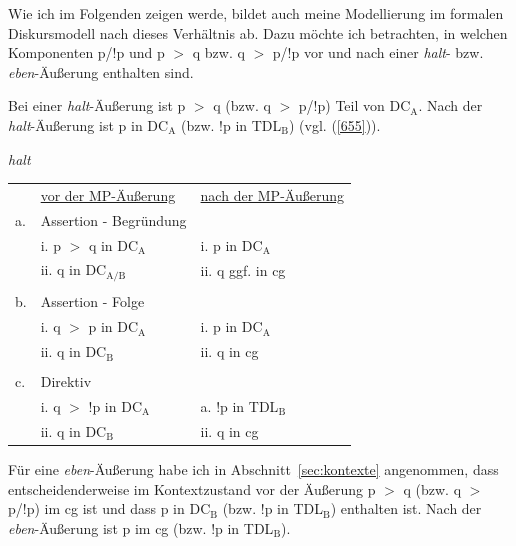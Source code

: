 Wie ich im Folgenden zeigen werde, bildet auch meine Modellierung im formalen Diskursmodell nach \citet{Farkas2010} dieses Verhältnis ab. Dazu möchte ich betrachten, in welchen Komponenten p/!p und p $>$ q bzw. q $>$ p/!p vor und nach einer \textit{halt}- bzw. \textit{eben}-Äußerung enthalten sind.  

Bei einer \textit{halt}-Äußerung ist p $>$ q (bzw. q $>$ p/!p) Teil von DC$_{\textrm{A}}$. Nach der \textit{halt}-Äußerung ist p in DC$_{\textrm{A}}$ (bzw. !p in TDL$_{\textrm{B}}$) (vgl. (\ref{655})).
\pagebreak
\begin{exe}
        \ex\label{655} \textit{halt}\\[-0.4em]
    \begin{tabular}[t]{lll}
    & \underline{vor der MP-Äußerung} & \underline{nach der MP-Äußerung}\\
    a. & Assertion - Begründung & {}\\
    {} & i. p $>$ q in DC$_{\textrm{A}}$ & i. p in DC$_{\textrm{A}}$\\
	{} & ii. q in DC$_{\textrm{A/B}}$ & ii. q ggf. in cg\\
	{} & {} & {}\\
	b. & Assertion - Folge & {}\\
	{} & i. q $>$ p in DC$_{\textrm{A}}$ & i. p in DC$_{\textrm{A}}$\\
	{} & ii. q in DC$_{\textrm{B}}$ & ii. q in cg\\
	{} & {} & {}\\
	c. & Direktiv & {}\\
	{} & i. q $>$ !p in DC$_{\textrm{A}}$ & a. !p in TDL$_{\textrm{B}}$\\
	{} & ii. q in DC$_{\textrm{B}}$ & ii. q in cg\\
    \end{tabular}
\end{exe}
Für eine \textit{eben}-Äußerung habe ich in Abschnitt~\ref{sec:kontexte} angenommen, dass entscheidenderweise im Kontextzustand vor der Äußerung p $>$ q (bzw. q $>$ p/!p) im cg ist und dass p in DC$_{\textrm{B}}$ (bzw. !p in TDL$_{\textrm{B}}$) enthalten ist. Nach der \textit{eben}-Äußerung ist p im cg (bzw. !p in TDL$_{\textrm{B}}$).

